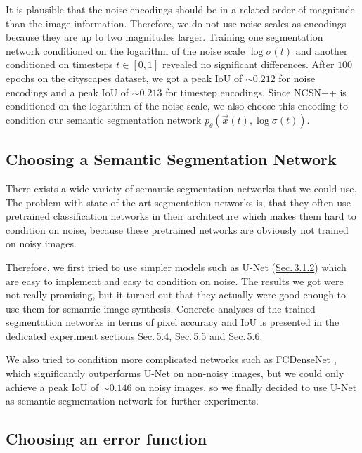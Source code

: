 It is plausible that the noise encodings should be in a related order of magnitude than the image information. Therefore, we do not use noise scales as encodings because they are up to two magnitudes larger. Training one segmentation network conditioned on the logarithm of the noise scale $\log \sigma(t)$ and another conditioned on timesteps $t\in[0,1]$ revealed no significant differences. After $100$ epochs on the cityscapes dataset, we got a peak IoU of $\sim0.212$ for noise encodings and a peak IoU of $\sim0.213$ for timestep encodings. Since NCSN++ is conditioned on the logarithm of the noise scale, we also choose this encoding to condition our semantic segmentation network $p_\theta(\vec{x}(t), \log \sigma(t))$.

\subsection{Choosing a Semantic Segmentation Network}

There exists a wide variety of semantic segmentation networks that we could use. The problem with state-of-the-art segmentation networks is, that they often use pretrained classification networks in their architecture which makes them hard to condition on noise, because these pretrained networks are obviously not trained on noisy images. 

Therefore, we first tried to use simpler models such as U-Net (\hyperref[sec:3.1.2]{Sec.\,3.1.2}) which are easy to implement and easy to condition on noise. The results we got were not really promising, but it turned out that they actually were good enough to use them for semantic image synthesis. Concrete analyses of the trained segmentation networks in terms of pixel accuracy and IoU is presented in the dedicated experiment sections \hyperref[sec:5.4]{Sec.\,5.4}, \hyperref[sec:5.5]{Sec.\,5.5} and \hyperref[sec:5.6]{Sec.\,5.6}.

We also tried to condition more complicated networks such as FCDenseNet \cite{densenet}, which significantly outperforms U-Net on non-noisy images, but we could only achieve a peak IoU of $\sim0.146$ on noisy images, so we finally decided to use U-Net as semantic segmentation network for further experiments.

\subsection{Choosing an error function}


